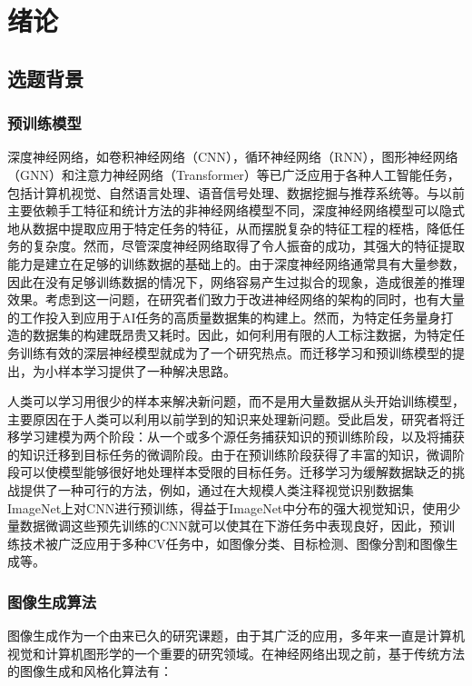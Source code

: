 \chapter{绪论}
\label{chap:1}

\section{选题背景}

\subsection{预训练模型}

深度神经网络，如卷积神经网络（CNN），循环神经网络（RNN），图形神经网络（GNN）和注意力神经网络（Transformer）等已广泛应用于各种人工智能任务，包括计算机视觉、自然语言处理、语音信号处理、数据挖掘与推荐系统等。与以前主要依赖手工特征和统计方法的非神经网络模型不同，深度神经网络模型可以隐式地从数据中提取应用于特定任务的特征，从而摆脱复杂的特征工程的桎梏，降低任务的复杂度。然而，尽管深度神经网络取得了令人振奋的成功，其强大的特征提取能力是建立在足够的训练数据的基础上的。由于深度神经网络通常具有大量参数，因此在没有足够训练数据的情况下，网络容易产生过拟合的现象，造成很差的推理效果。考虑到这一问题，在研究者们致力于改进神经网络的架构的同时，也有大量的工作投入到应用于AI任务的高质量数据集的构建上。然而，为特定任务量身打造的数据集的构建既昂贵又耗时。因此，如何利用有限的人工标注数据，为特定任务训练有效的深层神经模型就成为了一个研究热点。而迁移学习和预训练模型的提出，为小样本学习提供了一种解决思路。 

人类可以学习用很少的样本来解决新问题，而不是用大量数据从头开始训练模型，主要原因在于人类可以利用以前学到的知识来处理新问题。受此启发，研究者将迁移学习建模为两个阶段：从一个或多个源任务捕获知识的预训练阶段，以及将捕获的知识迁移到目标任务的微调阶段。由于在预训练阶段获得了丰富的知识，微调阶段可以使模型能够很好地处理样本受限的目标任务。迁移学习为缓解数据缺乏的挑战提供了一种可行的方法，例如，通过在大规模人类注释视觉识别数据集ImageNet上对CNN进行预训练，得益于ImageNet中分布的强大视觉知识，使用少量数据微调这些预先训练的CNN就可以使其在下游任务中表现良好，因此，预训练技术被广泛应用于多种CV任务中，如图像分类、目标检测、图像分割和图像生成等。

\subsection{图像生成算法}

图像生成作为一个由来已久的研究课题，由于其广泛的应用，多年来一直是计算机视觉和计算机图形学的一个重要的研究领域。在神经网络出现之前，基于传统方法的图像生成和风格化算法有：

